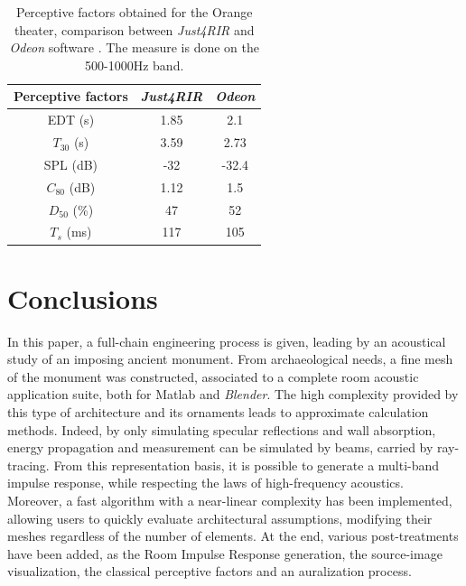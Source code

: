 \documentclass[AMA,STIX1COL]{WileyNJD-v2}
\begin{document}
\begin{table}[h]
\centering
 \begin{tabular}{| *{3}{c|}} 
 \hline 
 Perceptive factors & \textit{Just4RIR} & \textit{Odeon} \\ 
 \hline 
 \hline 
  EDT (s)& 1.85& 2.1 \\ 
 \hline 
$T_{30}$ (s)& 3.59&  2.73\\ 
 \hline 
SPL (dB) &-32 & -32.4\\ 
 \hline 
$C_{80}$ (dB)& 1.12&1.5  \\ 
 \hline 
$D_{50}$ (\%)&47 & 52 \\ 
 \hline 
$T_s$ (ms)&117 & 105 \\ 
 \hline 
\end{tabular} 
 \caption{Perceptive factors obtained for the Orange theater, comparison between \textit{Just4RIR} and \textit{Odeon} software \cite{odeon}. The measure is done on the 500-1000Hz band.}
 \label{tab_rindel} 
 \end{table}

\section{Conclusions}

In this paper, a full-chain engineering process is given, leading by an acoustical study of an imposing ancient monument. From archaeological needs, a fine mesh of the monument was constructed, associated to a complete room acoustic application suite, both for {\sc Matlab} and \textit{Blender}. The high complexity provided by this type of architecture and its ornaments leads to approximate calculation methods. Indeed, by only simulating specular reflections and wall absorption, energy propagation and measurement can be simulated by beams, carried by ray-tracing. From this representation basis, it is possible to generate a multi-band impulse response, while respecting the laws of high-frequency acoustics. Moreover, a fast algorithm with a near-linear complexity has been implemented, allowing users to quickly evaluate architectural assumptions, modifying their meshes regardless of the number of elements. At the end, various post-treatments have been added, as the Room Impulse Response generation, the source-image visualization, the classical perceptive factors and an auralization process.
\end{document}
